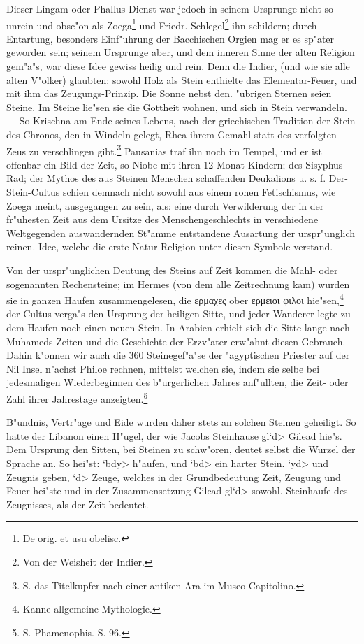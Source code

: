 \documentclass[a4paper, 11pt, oneside, polutonikogreek, german]{article}
\begin{document}
Dieser Lingam oder Phallus-Dienst war jedoch in seinem Ursprunge nicht so unrein und obsc"on als Zoega\footnote{De orig. et usu obelisc.} und Friedr. Schlegel\footnote{Von der Weisheit der Indier.} ihn schildern; durch Entartung, besonders Einf"uhrung der Bacchischen Orgien mag er es sp"ater geworden sein; seinem Ursprunge aber, und dem inneren Sinne der alten Religion gem"a"s, war diese Idee gewiss heilig und rein. Denn die Indier, (und wie sie alle alten V"olker) glaubten: sowohl Holz als Stein enthielte das Elementar-Feuer, und mit ihm das Zeugungs-Prinzip. Die Sonne nebst den. "ubrigen Sternen seien Steine. Im Steine lie"sen sie die Gottheit wohnen, und sich in Stein verwandeln. --- So Krischna am Ende seines Lebens, nach der griechischen Tradition der Stein des Chronos, den in Windeln gelegt, Rhea ihrem Gemahl statt des verfolgten Zeus zu verschlingen gibt.\footnote{S. das Titelkupfer nach einer antiken Ara im Museo Capitolino.} Pausanias traf ihn noch im Tempel, und er ist offenbar ein Bild der Zeit, so Niobe mit ihren 12 Monat-Kindern; des Sisyphus Rad; der Mythos des aus Steinen Menschen schaffenden Deukalions u. s. f. Der-Stein-Cultus schien demnach nicht sowohl aus einem rohen Fetischismus, wie Zoega meint, ausgegangen zu sein, als: eine durch Verwilderung der in der fr"uhesten Zeit aus dem Ursitze des Menschengeschlechts in verschiedene Weltgegenden auswandernden St"amme entstandene Ausartung der urspr"unglich reinen. Idee, welche die erste Natur-Religion unter diesen Symbole verstand.

Von der urspr"unglichen Deutung des Steins auf Zeit kommen die Mahl- oder sogenannten Rechensteine; im Hermes (von dem alle Zeitrechnung kam) wurden sie in ganzen Haufen zusammengelesen, die ερμαχες ober ερμειοι φιλοι hie"sen,\footnote{Kanne allgemeine Mythologie.} der Cultus verga"s den Ursprung der heiligen Sitte, und jeder Wanderer legte zu dem Haufen noch einen neuen Stein. In Arabien erhielt sich die Sitte lange nach Muhameds Zeiten und die Geschichte der Erzv"ater erw"ahnt diesen Gebrauch. Dahin k"onnen wir auch die 360 Steinegef"a"se der "agyptischen Priester auf der Nil Insel n"achst Philoe rechnen, mittelst welchen sie, indem sie selbe bei jedesmaligen Wiederbeginnen des b"urgerlichen Jahres anf"ullten, die Zeit- oder Zahl ihrer Jahrestage anzeigten.\footnote{S. Phamenophis. S. 96.}

B"undnis, Vertr"age und Eide wurden daher stets an solchen Steinen geheiligt. So hatte der Libanon einen H"ugel, der wie Jacobs Steinhause \<gl`d> Gilead hie"s. Dem Ursprung den Sitten, bei Steinen zu schw"oren, deutet selbst die Wurzel der Sprache an. So hei"st: \<`bdy> h"aufen, und \<`bd> ein harter Stein. \<`yd> und Zeugnis geben, \<`d> Zeuge, welches in der Grundbedeutung Zeit, Zeugung und Feuer hei"ste und in der Zusammensetzung Gilead \<gl`d> sowohl. Steinhaufe des Zeugnisses, als der Zeit bedeutet.
\end{document}
